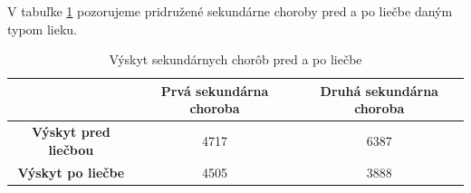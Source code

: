 V tabuľke \ref{tab:sekundarne} pozorujeme pridružené sekundárne choroby pred a po liečbe daným typom lieku.

\begin{table}[!h]
\centering
\begin{tabular}{c|cc}
\hline
                             & \textbf{Prvá sekundárna choroba} & \textbf{Druhá sekundárna choroba} \\ \hline
\textbf{Výskyt pred liečbou} & 4717                             & 6387                              \\ \hline
\textbf{Výskyt po liečbe}    & 4505                             & 3888                              \\ \hline
\end{tabular}
\caption{Výskyt sekundárnych chorôb pred a po liečbe}
\label{tab:sekundarne}
\end{table}





























